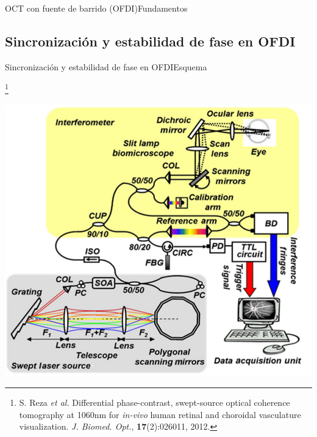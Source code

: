 \documentclass[fleqn,10pt]{beamer}
\newcommand\blfootnote[1]{%
	\begingroup
	\renewcommand\thefootnote{}\footnote{#1}%
	\addtocounter{footnote}{-1}%
	\endgroup
}
\begin{document}
\begin{frame}{OCT con fuente de barrido (OFDI)}{Fundamentos}

\end{frame}

\subsection{Sincronización y estabilidad de fase en OFDI}
\begin{frame}{Sincronización y estabilidad de fase en OFDI}{Esquema}
	
	\blfootnote{{\tiny S. Reza \emph{et al.} Differential phase-contrast, swept-source optical coherence tomography at 1060nm for \emph{in-vivo} human retinal and choroidal vasculature visualization. \emph{J. Biomed. Opt.}, \textbf{17}(2):026011, 2012.}}
	\centering
	\includegraphics[width=0.8\linewidth]{AAUgraphics/pt4/SS_System}

\end{frame}
\end{document}
